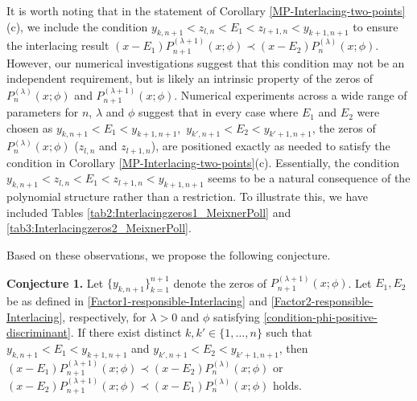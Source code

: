 \documentclass[final,3p,times,12pt]{elsarticle}
\numberwithin{equation}{section}  %
\begin{document}
	It is worth noting that in the statement of Corollary \ref{MP-Interlacing-two-points}(c), we include the condition $y_{k,n+1} < z_{l,n} < E_1 < z_{l+1,n} < y_{k+1,n+1}$ to ensure the interlacing result $(x-E_1)P_{n+1}^{(\lambda+1)}(x;\phi)\prec (x-E_2)P_{n}^{(\lambda)}(x;\phi)$. However, our numerical investigations suggest that this condition may not be an independent requirement, but is likely an intrinsic property of the zeros of $P_{n}^{(\lambda)}(x;\phi)$ and $P_{n+1}^{(\lambda+1)}(x;\phi)$.  Numerical experiments across a wide range of parameters for $n$, $\lambda$ and $\phi$ suggest that in every case where $E_1$ and $E_2$ were chosen as $y_{k,n+1} < E_1 < y_{k+1,n+1},$	$y_{k',n+1} < E_2 < y_{k'+1,n+1}$, the zeros of $P_{n}^{(\lambda)}(x;\phi)$ ($z_{l,n}$ and $z_{l+1,n}$), are positioned exactly as needed to satisfy the condition in Corollary \ref{MP-Interlacing-two-points}(c). Essentially, the condition $y_{k,n+1} < z_{l,n} < E_1 < z_{l+1,n} < y_{k+1,n+1}$  seems to be a natural consequence of the polynomial structure rather than a restriction. To illustrate this, we have included Tables \ref{tab2:Interlacingzeros1_MeixnerPoll} and \ref{tab3:Interlacingzeros2_MeixnerPoll}. 

    
	
	
Based on these observations, we propose the following conjecture. \vspace{0.3cm}
	
	\textbf{Conjecture 1.}  Let $\{y_{k,n+1}\}_{k=1}^{n+1}$ denote the zeros of $P_{n+1}^{(\lambda+1)}(x;\phi)$.  Let $E_1, E_2$ be as defined in \eqref{Factor1-responsible-Interlacing} and \eqref{Factor2-responsible-Interlacing}, respectively, for $\lambda >0$ and $\phi$ satisfying \eqref{condition-phi-positive-discriminant}. If there exist distinct $k, k' \in \{1, \dots, n\}$ such that $y_{k,n+1} < E_1 < y_{k+1,n+1}$ and $y_{k',n+1} < E_2 < y_{k'+1,n+1}$, then  $\displaystyle (x-E_1)P_{n+1}^{(\lambda+1)}(x;\phi) \prec (x-E_2)P_{n}^{(\lambda)}(x;\phi)$ or $\displaystyle (x-E_2)P_{n+1}^{(\lambda+1)}(x;\phi) \prec (x-E_1)P_{n}^{(\lambda)}(x;\phi)$ holds.
	
\end{document}
